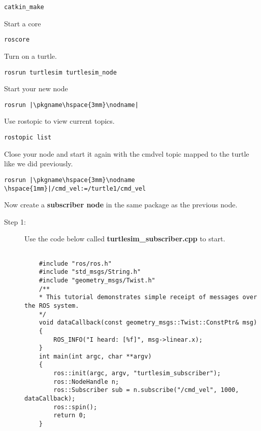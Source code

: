 \documentclass[12pt]{article}
\newcommand{\K}{\color{black}}
\newcommand{\G}{\color{mygreen}}
\newcommand{\PR}{\color{mypurple}}
\newcommand{\pkgname}{\G<package\_name>\K}
\newcommand{\nodname}{\PR<node\_name>\K}
\begin{document}
\begin{description}[labelindent=1cm]
\begin{description}
	\begin{verbatim}  
catkin_make
	\end{verbatim}
	
	Start a core
	\begin{verbatim} 
roscore
	\end{verbatim}
	
	Turn on a turtle.
	\begin{verbatim} 
rosrun turtlesim turtlesim_node
	\end{verbatim}
	
	Start your new node
	\begin{verbatim} 
rosrun |\pkgname\hspace{3mm}\nodname|
	\end{verbatim}
	
	Use rostopic to view current topics. 
	\begin{verbatim}  
rostopic list
	\end{verbatim}
	
	
	Close your node and start it again with the cmd\textunderscore vel topic mapped to the turtle like we did previously.
	\begin{verbatim} 
rosrun |\pkgname\hspace{3mm}\nodname \hspace{1mm}|/cmd_vel:=/turtle1/cmd_vel
	\end{verbatim}
	 
	\end{description}
	 
	 
	\newpage
	
	
\item[\textbf{\underline{Part III - Create A \href{http://wiki.ros.org/ROS/Tutorials/WritingPublisherSubscriber(c++)}{{\bf Subscriber }}Node:}}] \hfill \vspace{0mm}
	 	
	Now create a {\bf subscriber node} in the same package as the previous node. 
	
	\begin{description}
	
	\item [Step 1:] Use the code below called {\bf turtlesim\_subscriber.cpp} to start.\\
	
	\begin{lstlisting}
	
	#include "ros/ros.h"
	#include "std_msgs/String.h"
	#include "geometry_msgs/Twist.h"
	/**
	* This tutorial demonstrates simple receipt of messages over the ROS system.
	*/
	void dataCallback(const geometry_msgs::Twist::ConstPtr& msg)
	{
		ROS_INFO("I heard: [%f]", msg->linear.x);
	}
	int main(int argc, char **argv)
	{
		ros::init(argc, argv, "turtlesim_subscriber");
		ros::NodeHandle n;
		ros::Subscriber sub = n.subscribe("/cmd_vel", 1000, dataCallback);
		ros::spin();
		return 0;
	}
	

\end{lstlisting}
\end{description}
\end{description}
\end{document}
